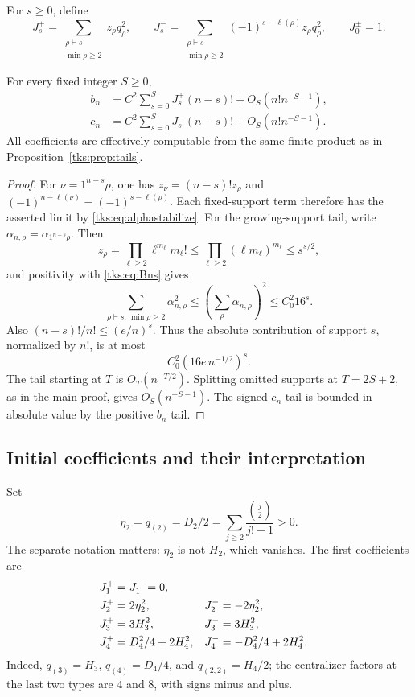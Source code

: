 For $s\geq0$, define
\begin{equation}\label{tks:eq:Js}
J_s^+=\sum_{\substack{\rho\vdash s\\\min\rho\geq2}}z_\rho q_\rho^2,
\qquad
J_s^-=\sum_{\substack{\rho\vdash s\\\min\rho\geq2}}
                (-1)^{s-\ell(\rho)}z_\rho q_\rho^2,
\qquad J_0^\pm=1.
\end{equation}
\begin{theorem}\label{tks:thm:companions}
For every fixed integer $S\geq0$,
\begin{align}
b_n&=C^2\sum_{s=0}^{S}J_s^+(n-s)!
                        +O_S(n!n^{-S-1}),\label{tks:eq:bexpansion}\\
c_n&=C^2\sum_{s=0}^{S}J_s^-(n-s)!
                        +O_S(n!n^{-S-1}).\label{tks:eq:cexpansion}
\end{align}
All coefficients are effectively computable from the same finite product as in Proposition~\ref{tks:prop:tails}.
\end{theorem}
\begin{proof}
For $\nu=1^{n-s}\rho$, one has $z_\nu=(n-s)!z_\rho$ and $(-1)^{n-\ell(\nu)}=(-1)^{s-\ell(\rho)}$. Each fixed-support term therefore has the asserted limit by \eqref{tks:eq:alphastabilize}. For the growing-support tail, write $\alpha_{n,\rho}=\alpha_{1^{n-s}\rho}$. Then
\[
z_\rho=\prod_{\ell\geq2}\ell^{m_\ell}m_\ell!
 \leq\prod_{\ell\geq2}(\ell m_\ell)^{m_\ell}
 \leq s^{s/2},
\]
and positivity with \eqref{tks:eq:Bns} gives
\[
\sum_{\rho\vdash s,\,\min\rho\geq2}\alpha_{n,\rho}^2
 \leq\left(\sum_\rho\alpha_{n,\rho}\right)^2
 \leq C_0^2 16^s.
\]
Also $(n-s)!/n!\leq(e/n)^s$. Thus the absolute contribution of support $s$, normalized by $n!$, is at most
\begin{equation}\label{tks:eq:companiontail}
C_0^2(16e\,n^{-1/2})^s.
\end{equation}
The tail starting at $T$ is $O_T(n^{-T/2})$. Splitting omitted supports at $T=2S+2$, as in the main proof, gives $O_S(n^{-S-1})$. The signed $c_n$ tail is bounded in absolute value by the positive $b_n$ tail.
\end{proof}

\subsection{Initial coefficients and their interpretation}
Set
\begin{equation}\label{tks:eq:eta}
\eta_2=q_{(2)}=D_2/2
 =\sum_{j\geq2}\frac{\binom j2}{j!-1}>0.
\end{equation}
The separate notation matters: $\eta_2$ is not $H_2$, which vanishes. The first coefficients are
\begin{align}
J_1^+&=J_1^-=0,\notag\\
J_2^+&=2\eta_2^2,&J_2^-&=-2\eta_2^2,\notag\\
J_3^+&=3H_3^2,&J_3^-&=3H_3^2,\notag\\
J_4^+&=D_4^2/4+2H_4^2,&J_4^-&=-D_4^2/4+2H_4^2.
\label{tks:eq:lowJs}
\end{align}
Indeed, $q_{(3)}=H_3$, $q_{(4)}=D_4/4$, and $q_{(2,2)}=H_4/2$; the centralizer factors at the last two types are $4$ and $8$, with signs minus and plus.

